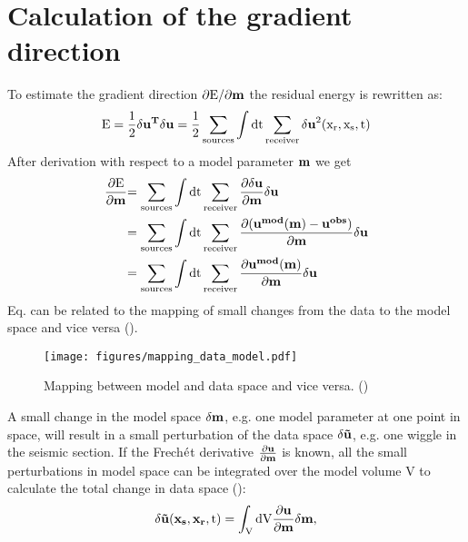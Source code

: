 \section{Calculation of the gradient direction}%
To estimate the gradient direction $\rm{\partial E/\partial \mathbf{m}}$ the residual energy is rewritten as:
\begin{equation} 
\rm{E = \frac{1}{2}\mathbf{\delta u^T} \mathbf{\delta u} = \frac{1}{2} \sum_{sources} \int dt \sum_{receiver} \mathbf{\delta u}^2(x_r, x_s, t) } 
\label{L2_continous}
\end{equation}
After derivation with respect to a model parameter $\rm{\mathbf{m}}$ we get
\begin{equation} 
\begin{split}
\rm{\frac{\partial E}{\partial \mathbf{m}}} &\rm{= \sum_{sources} \int dt \sum_{receiver} \frac{\partial \mathbf{\delta u}}{\partial
\mathbf{m}} \mathbf{\delta u}}\\ 
& \rm{= \sum_{sources} \int dt \sum_{receiver} \frac{\partial {(\mathbf{u^{mod}\mathbf(m)} - \mathbf{u^{obs}})}}{\partial
\mathbf{m}}  \mathbf{\delta u} }\\ 
&\rm{= \sum_{sources} \int dt \sum_{receiver} \frac{\partial {\mathbf{u^{mod}(\mathbf{m})}}}{\partial \mathbf{m}}  \mathbf{\delta u}} 
\label{dL2_dm}
\end{split}
\end{equation}
Eq.  can be related to the mapping of small changes from the data to the model space and vice versa (). 
\begin{figure}[ht]
\begin{center}
\texttt{[image: figures/mapping\_data\_model.pdf]}
\caption{Mapping between model and data space and vice versa. (\cite{koehn:11})}
\label{mapping_data_model}
\end{center}
\end{figure}
A small change in the model space $\rm{\delta \mathbf{m}}$, e.g. one model parameter at one point in space, will result in a small 
perturbation of the data space $\rm{\delta \mathbf{\tilde{u}}}$, e.g. one wiggle in the seismic section. If the Frech$\rm{\acute{e}}$t derivative $\rm{\frac{\partial \mathbf{u}}{\partial \mathbf{m}}}$ is known, all 
the small perturbations in model space can be integrated over the model volume V to calculate the total change in data space
(\cite{tarantola:2005}):
\begin{equation}
\rm{\delta \mathbf{\tilde{u}}(\mathbf{x_s},\mathbf{x_r},t) = \int_V dV \frac{\partial \mathbf{u}}{\partial \mathbf{m}} \delta 
\mathbf{m},}
\label{2:4}
\end{equation} 
